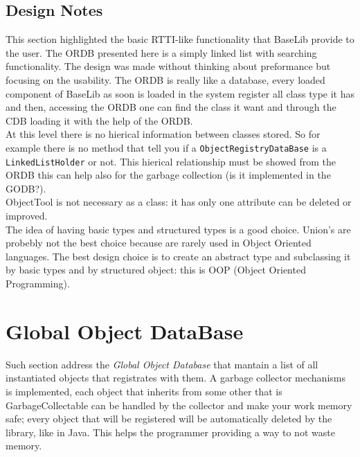 \subsection{Design Notes}
This section highlighted the basic RTTI-like functionality that BaseLib provide to the user. The ORDB presented here is a simply linked list with searching functionality. The design was made without thinking about preformance but focusing on the usability. The ORDB is really like a database, every loaded component of BaseLib as soon is loaded in the system register all class type it has and then, accessing the ORDB one can find the class it want and through the CDB loading it with the help of the ORDB. \\


At this level there is no hierical information between classes stored. So for example there is no method that tell you if a \texttt{ObjectRegistryDataBase} is a \texttt{LinkedListHolder} or not. This hierical relationship must be showed from the ORDB this can help also for the garbage collection (is it implemented in the GODB?). \\


ObjectTool is not necessary as a class: it has only one attribute can be deleted or improved.\\


The idea of having basic types and structured types is a good choice. Union's are probebly not the best choice because are rarely used in Object Oriented languages. The best design choice is to create an abstract type and subclassing it by basic types and by structured object: this is OOP (Object Oriented Programming).



\section{Global Object DataBase}
Such section address the \textit{Global Object Database} that mantain a list of all instantiated objects that registrates with them. A garbage collector mechanisms is implemented, each object that inherits from some other that is GarbageCollectable can be handled by the collector and make your work memory safe; every object that will be registered will be automatically deleted by the library, like in Java. This helps the programmer providing a way to not waste memory.

